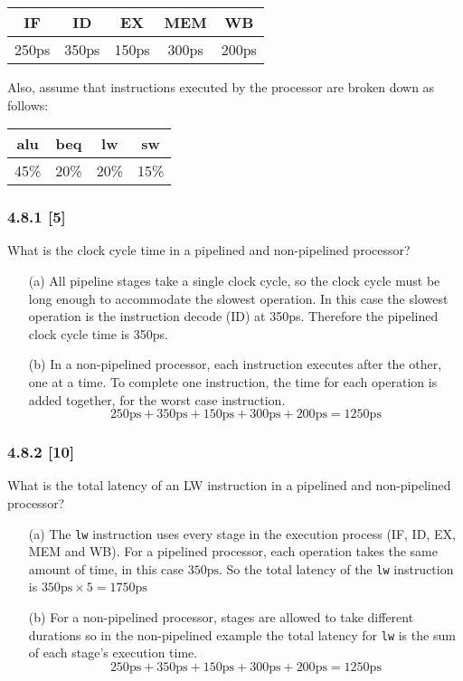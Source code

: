 \documentclass[fleqn]{article}
\begin{document}
\begin{table}[H]
    \centering
    \begin{tabular}{|c|c|c|c|c|}
    \hline
    \rowcolor[HTML]{1391DB} 
    IF & ID & EX & MEM & WB \\ \hline \hline
    250ps & 350ps & 150ps & 300ps & 200ps \\ \hline
    \end{tabular}
\end{table}

Also, assume that instructions executed by the processor are broken down as follows:
\begin{table}[H]
    \centering
    \begin{tabular}{|c|c|c|c|}
    \hline
    \rowcolor[HTML]{1391DB} 
    alu & beq & lw & sw  \\ \hline \hline
    45\% & 20\% & 20\% & 15\% \\ \hline
    \end{tabular}
\end{table}
\subsubsection*{4.8.1 [5] \textrangle} What is the clock cycle time in a pipelined and non-pipelined processor?
\begin{itemize}
    \item[(a)] All pipeline stages take a single clock cycle, so the clock cycle must be long enough to accommodate the slowest operation. In this case the slowest operation is the instruction decode (ID) at 350ps. Therefore the pipelined clock cycle time is 350ps.
    \item[(b)] In a non-pipelined processor, each instruction executes after the other, one at a time. To complete one instruction, the time for each operation is added together, for the worst case instruction. \[250\text{ps} + 350\text{ps} + 150\text{ps} + 300\text{ps} + 200\text{ps} = 1250\text{ps}\] 
\end{itemize}

\subsubsection*{4.8.2 [10] \textrangle} What is the total latency of an LW instruction in a pipelined and non-pipelined processor?
\begin{itemize}
    \item[(a)] The \verb|lw| instruction uses every stage in the execution process (IF, ID, EX, MEM and WB). For a pipelined processor, each operation takes the same amount of time, in this case $350\text{ps}$. So the total latency of the \verb|lw| instruction is $350\text{ps} \times 5 = 1750\text{ps}$
    \item[(b)] For a non-pipelined processor, stages are allowed to take different durations so in the non-pipelined example the total latency for \verb|lw| is the sum of each stage's execution time.  \[250\text{ps} + 350\text{ps} + 150\text{ps} + 300\text{ps} + 200\text{ps} = 1250\text{ps}\] 
\end{itemize}
\vspace{0.125in}
\end{document}
